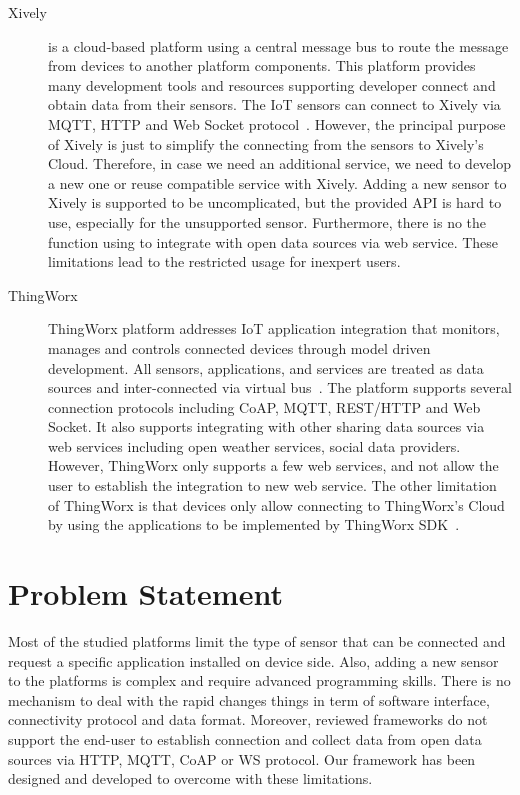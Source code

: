 \begin{description}
    \item [Xively] is a cloud-based platform using a central message bus to route the message from devices to another platform components. This platform provides many development tools and resources supporting developer connect and obtain data from their sensors. The IoT sensors can connect to Xively via MQTT, HTTP and Web Socket protocol~\cite{kohler2014platforms}. However, the principal purpose of Xively is just to simplify the connecting from the sensors to Xively’s Cloud. Therefore, in case we need an additional service, we need to develop a new one or reuse compatible service with Xively. Adding a new sensor to Xively is supported to be uncomplicated, but the provided API is hard to use, especially for the unsupported sensor. Furthermore, there is no the function using to integrate with open data sources via web service. These limitations lead to the restricted usage for inexpert users.
    
    \item [ThingWorx] ThingWorx platform addresses IoT application integration that monitors, manages and controls connected devices through model driven development. All sensors, applications, and services are treated as data sources and inter-connected via virtual bus~\cite{derhamy2015survey}. The platform supports several connection protocols including CoAP, MQTT, REST/HTTP and Web Socket. It also supports integrating with other sharing data sources via web services including open weather services, social data providers. However, ThingWorx only supports a few web services, and not allow the user to establish the integration to new web service. The other limitation of ThingWorx is that devices only allow connecting to ThingWorx’s Cloud by using the applications to be implemented by ThingWorx SDK~\cite{solutions25platform}.
    
\end{description}

\section{Problem Statement}
 Most of the studied platforms limit the type of sensor that can be connected and request a specific application installed on device side. Also, adding a new sensor to the platforms is complex and require advanced programming skills. There is no mechanism to deal with the rapid changes things in term of software interface, connectivity protocol and data format. Moreover, reviewed frameworks do not support the end-user to establish connection and collect data from open data sources via HTTP, MQTT, CoAP or WS protocol. Our framework has been designed and developed to overcome with these limitations.
 
